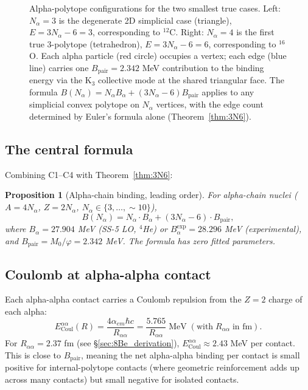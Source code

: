 \documentclass[11pt,letterpaper]{article}
\newtheorem{proposition}[theorem]{Proposition}
\newcommand{\phig}{\varphi}
\newcommand{\Mzero}{M_0}
\newcommand{\Bpair}{B_{\mathrm{pair}}}
\newcommand{\Balpha}{B_{\alpha}}
\newcommand{\Nalpha}{N_{\alpha}}
\newcommand{\Raa}{R_{\alpha\alpha}}
\begin{document}
\begin{figure}[H]
\begin{tikzpicture}[scale=1.3]
\end{tikzpicture}
\caption{Alpha-polytope configurations for the two smallest true cases. Left: $\Nalpha = 3$ is the degenerate 2D simplicial case (triangle), $E = 3\Nalpha - 6 = 3$, corresponding to ${}^{12}$C. Right: $\Nalpha = 4$ is the first true 3-polytope (tetrahedron), $E = 3\Nalpha - 6 = 6$, corresponding to ${}^{16}$O. Each alpha particle (red circle) occupies a vertex; each edge (blue line) carries one $\Bpair = 2.342$ MeV contribution to the binding energy via the K$_3$ collective mode at the shared triangular face. The formula $B(\Nalpha) = \Nalpha\Balpha + (3\Nalpha-6)\Bpair$ applies to any simplicial convex polytope on $\Nalpha$ vertices, with the edge count determined by Euler's formula alone (Theorem~\ref{thm:3N6}).}
\label{fig:polytope_pair}
\end{figure}

\subsection{The central formula}

Combining C1--C4 with Theorem~\ref{thm:3N6}:

\begin{proposition}[Alpha-chain binding, leading order]
\label{prop:SS7}
For alpha-chain nuclei ($A = 4\Nalpha$, $Z = 2\Nalpha$, $\Nalpha \in \{3, \ldots, \sim 10\}$),
\[
B(\Nalpha) = \Nalpha \cdot \Balpha + (3\Nalpha - 6) \cdot \Bpair,
\]
where $\Balpha = 27.904$ MeV (SS-5 LO, ${}^4$He) or $\Balpha^{\mathrm{exp}} = 28.296$ MeV (experimental), and $\Bpair = \Mzero/\phig = 2.342$ MeV. The formula has zero fitted parameters.
\end{proposition}

\subsection{Coulomb at alpha-alpha contact}

Each alpha-alpha contact carries a Coulomb repulsion from the $Z = 2$ charge of each alpha:
\[
E_{\mathrm{Coul}}^{\alpha\alpha}(R) = \frac{4 \alpha_{em} \hbar c}{\Raa} = \frac{5.765}{\Raa}\; \mathrm{MeV} \;(\text{with}\; \Raa \;\text{in fm}).
\]
For $\Raa = 2.37$ fm (see §\ref{sec:8Be_derivation}), $E_{\mathrm{Coul}}^{\alpha\alpha} \approx 2.43$ MeV per contact. This is close to $\Bpair$, meaning the net alpha-alpha binding per contact is small positive for internal-polytope contacts (where geometric reinforcement adds up across many contacts) but small negative for isolated contacts.
\end{document}
